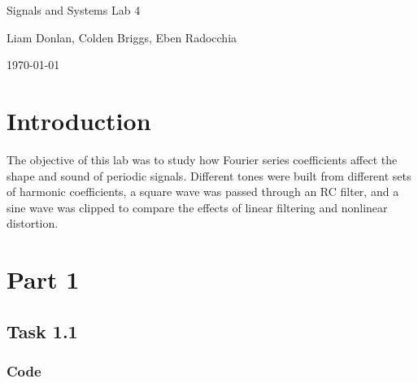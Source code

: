 \documentclass[11pt, a4paper]{article}
\begin{document}
\begin{titlepage}
    \vspace*{2cm}
    \centering
    {\huge Signals and Systems Lab 4\par}
    \vspace{0.5cm}
    {\large Liam Donlan, Colden Briggs, Eben Radocchia\par}
    \vspace{0.3cm}
    {\large \today \par}
\end{titlepage}

\newpage

\tableofcontents

\newpage

\section*{Introduction}

The objective of this lab was to study how Fourier series coefficients affect the shape and sound of periodic signals. Different tones were built from different sets of harmonic coefficients, a square wave was passed through an RC filter, and a sine wave was clipped to compare the effects of linear filtering and nonlinear distortion.


\section*{Part 1}

\subsection*{Task 1.1}

\subsubsection*{Code}
\end{document}
